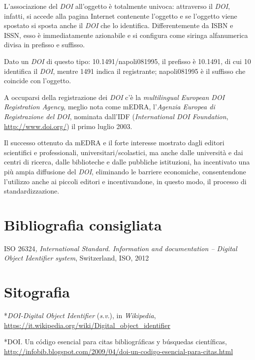 \documentclass[
  b5paper,
  twoside,
  12pt,
  chapterprefix=false,
  bibliography=totocnumbered,
  parskip=false]{scrbook}
\begin{document}
L'associazione del \emph{DOI} all'oggetto è totalmente univoca: attraverso il
\emph{DOI}, infatti, si accede alla pagina Internet contenente l'oggetto e se
l'oggetto viene spostato si sposta anche il \emph{DOI} che lo identifica.
Differentemente da ISBN e ISSN, esso è immediatamente azionabile e si
configura come siringa alfanumerica divisa in prefisso e suffisso.

Dato un \emph{DOI} di questo tipo: 10.1491/napoli081995, il prefisso è
10.1491, di cui 10 identifica il \emph{DOI}, mentre 1491 indica il
registrante; napoli081995 è il suffisso che coincide con l'oggetto.

A occuparsi della registrazione dei \emph{DOI} c'è la \emph{multilingual European
DOI Registration Agency}, meglio nota come mEDRA, l'\emph{Agenzia Europea di
Registrazione del} \emph{DOI}, nominata dall'IDF (\emph{International DOI
Foundation}, \url{http://www.doi.org/}) il primo
luglio 2003.

Il successo ottenuto da mEDRA e il forte interesse mostrato dagli
editori scientifici e professionali, universitari/scolastici, ma anche
dalle università e dai centri di ricerca, dalle biblioteche e dalle
pubbliche istituzioni, ha incentivato una più ampia diffusione del
\emph{DOI}, eliminando le barriere economiche, consentendone l'utilizzo anche
ai piccoli editori e incentivandone, in questo modo, il processo di
standardizzazione.

\hypertarget{bibliografia-consigliata-7}{%
\section*{Bibliografia consigliata}\label{bibliografia-consigliata-7}}

ISO 26324\emph{,} \emph{International Standard. Information and documentation --
Digital Object Identifier system}, Switzerland, ISO, 2012

\hypertarget{sitografia-9}{%
\section*{Sitografia}\label{sitografia-9}}

*\emph{DOI-Digital Object Identifier} (\emph{s.v}.), in \emph{Wikipedia},
\url{https://it.wikipedia.org/wiki/Digital_object_identifier}

*DOI. Un código esencial para citas bibliográficas y búsquedas
científicas,
\url{http://infobib.blogspot.com/2009/04/doi-un-codigo-esencial-para-citas.html}
\end{document}
